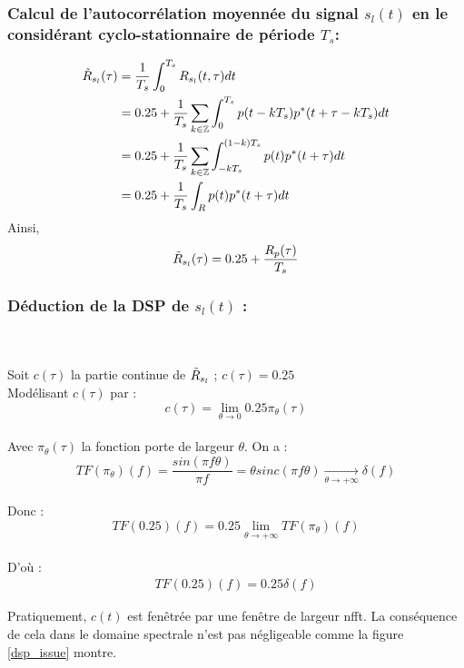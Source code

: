 \documentclass{rapport}
\begin{document}
{\subsubsection{\large Calcul de l'autocorrélation moyennée du signal $s_l(t)$ en le considérant cyclo-stationnaire de période $T_s$:}
$$
\begin{align}
  \Tilde{R}_{s_l}(\tau) &= \frac{1}{T_s} \int_{0}^{T_s} R_{s_l}(t, \tau)dt\\
                        &= 0.25 + \frac{1}{T_s} \sum\limits_{k \in \mathbb{Z}} \int_{0}^{T_s} p(t - kT_s)p^*(t + \tau - kT_s)dt\\
                        &= 0.25 + \frac{1}{T_s} \sum\limits_{k \in \mathbb{Z}} \int_{-kT_s}^{(1-k)T_s} p(t)p^*(t + \tau)dt\\
                        &=  0.25 + \frac{1}{T_s} \int_{R} p(t)p^*(t + \tau)dt
\end{align}
$$
Ainsi, 
\begin{equation}
    \Tilde{R}_{s_l}(\tau) = 0.25 + \frac{R_p(\tau)}{T_s}
\end{equation}

\subsubsection{\large Déduction de la DSP de $s_l(t)$ :}
\\\\
Soit $c(\tau)$ la partie continue de $\Tilde{R}_{s_l}$ ; $c(\tau) = 0.25$\\
Modélisant $c(\tau)$ par :\\
\[ c(\tau) = \lim_{\theta\to 0}  0.25\pi_{\theta}(\tau)\]
\\
Avec $\pi_{\theta}(\tau)$ la fonction porte de largeur $\theta$. On a :
\[ TF(\pi_{\theta})(f) = \frac{sin(\pi f \theta)}{\pi f} = \theta sinc(\pi f \theta) \underset{\theta \to +\infty}{\rightarrow} \delta(f) \]
\\
Donc :
\[ TF(0.25)(f) = 0.25 \lim_{\theta \to +\infty} TF(\pi_{\theta})(f) \]
\\D'où :
\begin{align}
     TF(0.25)(f) = 0.25\delta(f)
     \label{tf_0_25}
\end{align}

Pratiquement, $c(t)$ est fenêtrée par une fenêtre de largeur nfft. La conséquence de cela dans le domaine spectrale n'est pas négligeable comme la figure \ref{dsp_issue} montre.

}
\end{document}
